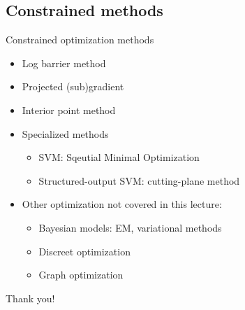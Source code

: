 \documentclass[draft]{beamer}
\newcommand{\chuhao}{\fontsize{44.9pt}{\baselineskip}\selectfont}
\begin{document}
\subsection{Constrained methods} 
\begin{frame}{Constrained optimization methods}
	\begin{itemize}
		\item Log barrier method 
		\item Projected (sub)gradient 
		\item Interior point method 
		\item Specialized methods 
		\begin{itemize}
			\item SVM: Sqeutial Minimal Optimization 
			\item Structured-output SVM: cutting-plane method 
		\end{itemize}
		\item Other optimization not covered in this lecture: 
		\begin{itemize}
			\item Bayesian models: EM, variational methods 
			\item Discreet optimization 
			\item Graph optimization 
		\end{itemize}
	\end{itemize}
\end{frame}

%
%

\begin{frame}
\chuhao Thank you! %
\end{frame}
		
	
\end{document}
